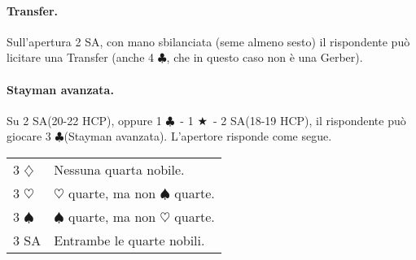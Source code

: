 \documentclass[a4paper,10pt]{article}
\renewcommand{\c}{$\clubsuit$\xspace}
\renewcommand{\d}{$\diamondsuit$\xspace}
\newcommand{\h}{$\heartsuit$\xspace}
\newcommand{\s}{$\spadesuit$\xspace}
\renewcommand{\j}{$\bigstar$\xspace}
\newcommand{\sa}{SA\xspace}
\newcommand{\smallspace}{\vskip0.3cm}
\newenvironment{twocol}
  {\smallspace\noindent\begin{tabular}{l p{0.78\textwidth}}}
  {\end{tabular}\smallspace}
\begin{document}
\paragraph{Transfer.} Sull'apertura 2 \sa, con mano sbilanciata (seme almeno sesto) il rispondente può licitare una Transfer (anche 4 \c, che in questo caso non è una Gerber).

\paragraph{Stayman avanzata.} Su 2 \sa (20-22 HCP), oppure 1 \c\ - 1 \j\ - 2 \sa (18-19 HCP), il rispondente può giocare 3 \c (Stayman avanzata). L'apertore risponde come segue.
\begin{twocol}
	3 \d & Nessuna quarta nobile.\\
	3 \h & \h quarte, ma non \s quarte.\\
	3 \s & \s quarte, ma non \h quarte.\\
	3 \sa & Entrambe le quarte nobili.\\
\end{twocol}
\end{document}
